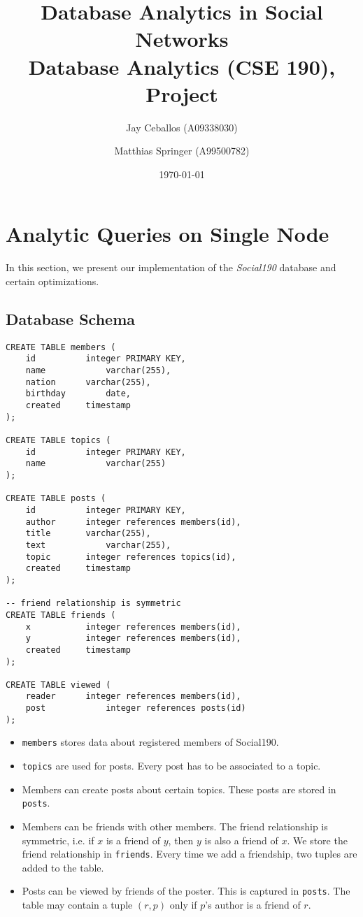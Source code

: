 \documentclass[12pt]{article}
\begin{document}
\title{Database Analytics in Social Networks  \\ \vspace{2 mm} {\large Database Analytics (CSE 190), Project}}
\date{\today}
\author{Jay Ceballos (A09338030) \and Matthias Springer (A99500782)}
\maketitle

\section{Analytic Queries on Single Node}
In this section, we present our implementation of the \emph{Social190} database and certain optimizations.

\subsection{Database Schema}
\begin{lstlisting}
CREATE TABLE members (
	id			integer PRIMARY KEY,
	name			varchar(255),
	nation		varchar(255),
	birthday		date,
	created		timestamp
);

CREATE TABLE topics (
	id			integer PRIMARY KEY,
	name			varchar(255)
);

CREATE TABLE posts (
	id			integer PRIMARY KEY,
	author		integer references members(id),
	title		varchar(255),
	text			varchar(255),
	topic		integer references topics(id),
	created		timestamp
);

-- friend relationship is symmetric
CREATE TABLE friends (
	x			integer references members(id),
	y			integer references members(id),
	created		timestamp
);

CREATE TABLE viewed (
	reader		integer references members(id),
	post			integer references posts(id)
);
\end{lstlisting}

\begin{itemize}
	\item \lstinline{members} stores data about registered members of Social190.
    \item \lstinline{topics} are used for posts. Every post has to be associated to a topic.
    \item Members can create posts about certain topics. These posts are stored in \lstinline{posts}.
    \item Members can be friends with other members. The friend relationship is symmetric, i.e. if $x$ is a friend of $y$, then $y$ is also a friend of $x$. We store the friend relationship in \lstinline{friends}. Every time we add a friendship, two tuples are added to the table.
    \item Posts can be viewed by friends of the poster. This is captured in \lstinline{posts}. The table may contain a tuple $(r, p)$ only if $p$'s author is a friend of $r$.
\end{itemize}
\end{document}
